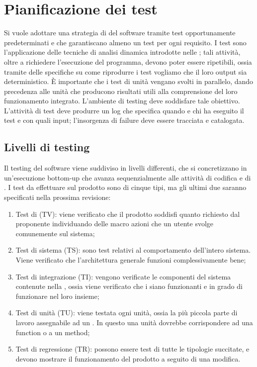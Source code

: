 \newpage
\section{Pianificazione dei test}

	Si vuole adottare una strategia di  del software tramite test opportunamente predeterminati e che garantiscano almeno un test per ogni requisito. I test sono l’applicazione delle tecniche di analisi dinamica introdotte nelle \NormeDiProgetto; tali attività, oltre a richiedere l’esecuzione del programma, devono poter essere ripetibili, ossia tramite delle specifiche su come riprodurre i test vogliamo che il loro output sia deterministico. È importante che i test di unità vengano svolti in parallelo, dando precedenza alle unità che producono risultati utili alla comprensione del loro funzionamento integrato. L’ambiente di testing deve soddisfare tale obiettivo. L’attività di test deve produrre un log che specifica quando e chi ha eseguito il test e con quali input; l’insorgenza di failure deve essere tracciata e catalogata.

\subsection{Livelli di testing}
	Il testing del software viene suddiviso in livelli differenti, che si concretizzano in un'esecuzione bottom-up che avanza sequenzialmente alle attività di codifica e di . I test da effettuare sul prodotto sono di cinque tipi, ma gli ultimi due saranno specificati nella prossima revisione:

\begin{enumerate}
	\item Test di  (TV): viene verificato che il prodotto soddisfi quanto richiesto dal proponente individuando delle macro azioni che un utente svolge comunemente sul sistema;
	\item Test di sistema (TS): sono test relativi al comportamento dell’intero sistema. Viene verificato che l'architettura generale funzioni complessivamente bene;
	\item Test di integrazione (TI): vengono verificate le componenti del sistema contenute nella \SpecificaTecnica, ossia viene verificato che i  siano funzionanti e in grado di funzionare nel loro insieme;
	\item Test di unità (TU): viene testata ogni unità, ossia la più piccola parte di lavoro assegnabile ad un . In questo  una unità dovrebbe corrispondere ad una function o a un method;
	\item Test di regressione (TR): possono essere test di tutte le tipologie succitate, e devono mostrare il funzionamento del prodotto a seguito di una modifica.
\end{enumerate}

